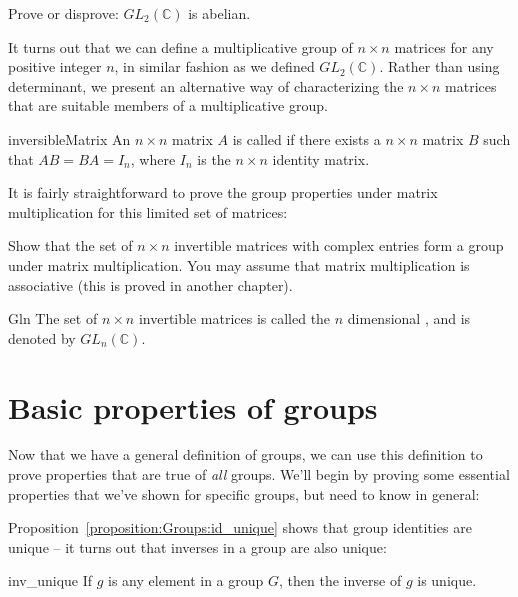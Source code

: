 \begin{exercise}{}
Prove or disprove: $GL_2(\mathbb C)$ is abelian.
\end{exercise}

It turns out that we can define a multiplicative group of $n \times n$ matrices for any positive integer $n$, in similar fashion as we defined $GL_2(\mathbb{C})$.  Rather than using determinant, we present an alternative way of characterizing the $n \times n$ matrices that are suitable members of a multiplicative group.

\begin{defn}{inversibleMatrix} 
An $n \times n$ matrix $A$ is called  if there exists a $n \times n$ matrix $B$ such that $AB = BA = I_n$, where $I_n$ is the $n \times n$ identity matrix.
\end{defn}

It is fairly straightforward to prove the group properties under matrix multiplication for this limited set of matrices:

\begin{exercise}{} 
Show that the set of  $n \times n$  invertible matrices with complex entries form a group under matrix multiplication.  You may assume that
matrix multiplication is associative (this is proved  in another chapter). 
\end{exercise}

\begin{defn}{Gln}
The set of $n \times n$ invertible matrices is called the $n$ dimensional , and is denoted by $GL_n(\mathbb{C})$.
\end{defn}


\section{Basic properties of groups}
\label{sec:Groups:GroupProperties}
 
Now that we have a general definition of groups, we can use this definition to prove properties that are true of \emph{all} groups. We'll begin by proving some essential properties that we've shown for specific groups, but need to know in general:

 
 Proposition~\ref{proposition:Groups:id_unique} shows that group identities are unique -- it turns out that inverses in a group are also unique:
 
\begin{prop}{inv_unique}
If $g$ is any element in a group $G$, then the inverse of $g$  is unique. 
\end{prop}


